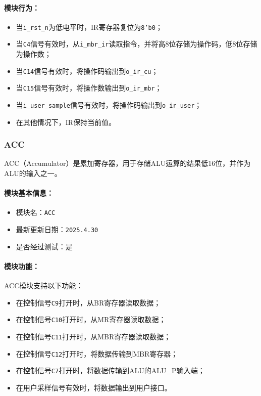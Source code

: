 \documentclass[lang=cn,a4paper,newtx]{elegantpaper}
\begin{document}
\paragraph{模块行为：}
\begin{itemize}
  \item 当\texttt{i\_rst\_n}为低电平时，IR寄存器复位为\texttt{8'b0}；
  \item 当\texttt{C4}信号有效时，从\texttt{i\_mbr\_ir}读取指令，并将高8位存储为操作码，低8位存储为操作数；
  \item 当\texttt{C14}信号有效时，将操作码输出到\texttt{o\_ir\_cu}；
  \item 当\texttt{C15}信号有效时，将操作数输出到\texttt{o\_ir\_mbr}；
  \item 当\texttt{i\_user\_sample}信号有效时，将操作码输出到\texttt{o\_ir\_user}；
  \item 在其他情况下，IR保持当前值。
\end{itemize}
\subsubsection{ACC}
ACC（Accumulator）是累加寄存器，用于存储ALU运算的结果低16位，并作为ALU的输入之一。

\paragraph{模块基本信息：}
\begin{itemize}
  \item 模块名：\texttt{ACC}
  \item 最新更新日期：\texttt{2025.4.30}
  \item 是否经过测试：是
\end{itemize}

\paragraph{模块功能：}
ACC模块支持以下功能：
\begin{itemize}
  \item 在控制信号\texttt{C9}打开时，从BR寄存器读取数据；
  \item 在控制信号\texttt{C10}打开时，从MR寄存器读取数据；
  \item 在控制信号\texttt{C11}打开时，从MBR寄存器读取数据；
  \item 在控制信号\texttt{C12}打开时，将数据传输到MBR寄存器；
  \item 在控制信号\texttt{C7}打开时，将数据传输到ALU的ALU\_P输入端；
  \item 在用户采样信号有效时，将数据输出到用户接口。
\end{itemize}
\end{document}
